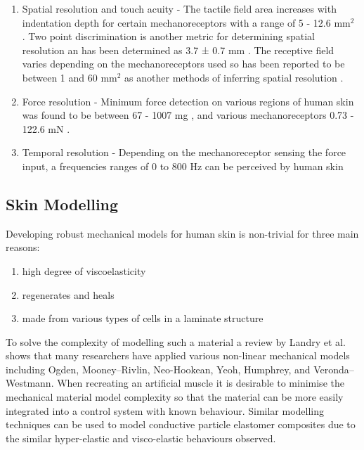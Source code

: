 \begin{enumerate}
    \item Spatial resolution and touch acuity - The tactile field area increases with indentation depth for certain mechanoreceptors with a range of 5 - 12.6 mm$^2$ \cite{Deflorio2022}. Two point discrimination is another metric for determining spatial resolution an has been determined as 3.7 ± 0.7 mm \cite{Yokota2020}. The receptive field varies depending on the mechanoreceptors used so has been reported to be between 1 and 60 mm$^2$ as another methods of inferring spatial resolution \cite{Roudaut2012}.
    \item Force resolution - Minimum force detection on various regions of human skin was found to be between 67 - 1007 mg \cite{Ackerley2014}, and various mechanoreceptors 0.73 - 122.6 mN \cite{Strzalkowski2015}.
    \item Temporal resolution - Depending on the mechanoreceptor sensing the force input, a frequencies ranges of 0 to 800 Hz can be perceived by human skin \cite{Deflorio2022}
\end{enumerate}


\subsection{Skin Modelling}
Developing robust mechanical models for human skin is non-trivial for three main reasons:
\begin{enumerate}
    \item high degree of viscoelasticity
    \item regenerates and heals
    \item made from various types of cells in a laminate structure 
\end{enumerate}
To solve the complexity of modelling such a material a review by Landry et al.\cite{Landry2021} shows that many researchers have applied various non-linear mechanical models including Ogden, Mooney–Rivlin, Neo-Hookean, Yeoh, Humphrey, and Veronda–Westmann. When recreating an artificial muscle it is desirable to minimise the mechanical material model complexity so that the material can be more easily integrated into a control system with known behaviour. Similar modelling techniques can be used to model conductive particle elastomer composites due to the similar hyper-elastic and visco-elastic behaviours observed.

